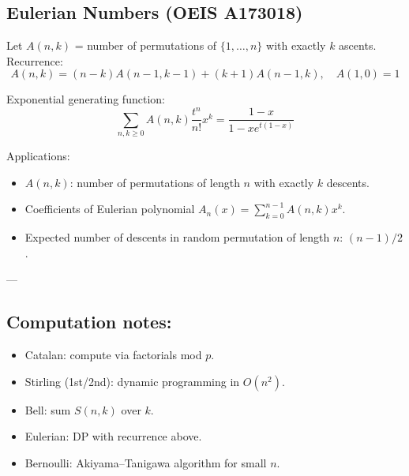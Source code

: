 \subsection*{Eulerian Numbers (OEIS A173018)}
Let \(A(n,k)\) = number of permutations of \(\{1,\dots,n\}\) with exactly \(k\) ascents.  
Recurrence:
\[
A(n,k) = (n-k)A(n-1,k-1) + (k+1)A(n-1,k), \quad A(1,0) = 1
\]

Exponential generating function:
\[
\sum_{n,k\ge0} A(n,k) \frac{t^n}{n!}x^k = \frac{1-x}{1 - x e^{t(1-x)}}
\]

Applications:
\begin{itemize}
  \item \(A(n,k)\): number of permutations of length \(n\) with exactly \(k\) descents.
  \item Coefficients of Eulerian polynomial \(A_n(x) = \sum_{k=0}^{n-1} A(n,k) x^k\).
  \item Expected number of descents in random permutation of length \(n\): \((n-1)/2\).
\end{itemize}

---

\subsection*{Computation notes:}
\begin{itemize}
  \item Catalan: compute via factorials mod \(p\).
  \item Stirling (1st/2nd): dynamic programming in \(O(n^2)\).
  \item Bell: sum \(S(n,k)\) over \(k\).
  \item Eulerian: DP with recurrence above.
  \item Bernoulli: Akiyama–Tanigawa algorithm for small \(n\).
\end{itemize}